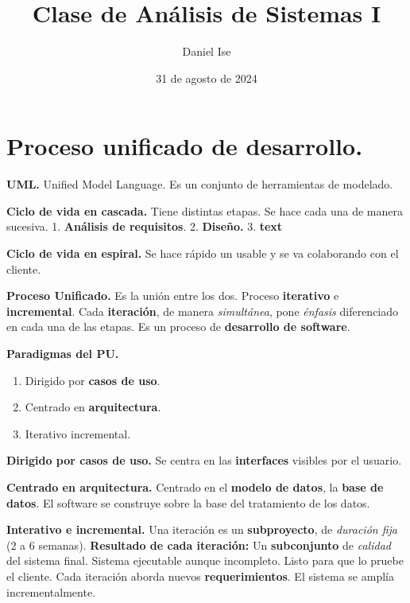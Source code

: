 \documentclass{article}
\title{Clase de Análisis de Sistemas I}
\author{Daniel Ise}
\date{31 de agosto de 2024}
\begin{document}
\maketitle

\section*{Proceso unificado de desarrollo.}

\textbf{UML.} Unified Model Language.
Es un conjunto de herramientas de modelado.

\textbf{Ciclo de vida en cascada.}
Tiene distintas etapas.
Se hace cada una de manera sucesiva.
1. \textbf{Análisis de requisitos}.
2. \textbf{Diseño.}
3. \textbf{text}

\textbf{Ciclo de vida en espiral.}
Se hace rápido un usable y se va colaborando con el cliente.

\textbf{Proceso Unificado.}
Es la unión entre los dos.
Proceso \textbf{iterativo} e \textbf{incremental}.
Cada \textbf{iteración}, de manera \textit{simultánea},
pone \textit{énfasis} diferenciado en cada una de las etapas.
Es un proceso de \textbf{desarrollo de software}.

\textbf{Paradigmas del PU.}

\begin{enumerate}
    \item Dirigido por \textbf{casos de uso}.
    \item Centrado en \textbf{arquitectura}.
    \item Iterativo incremental.
\end{enumerate}

\textbf{Dirigido por casos de uso.}
Se centra en las \textbf{interfaces} visibles por el usuario.

\textbf{Centrado en arquitectura.}
Centrado en el \textbf{modelo de datos}, la \textbf{base de datos}.
El software se construye sobre la base del tratamiento de los datos.

\textbf{Interativo e incremental.}
Una iteración es un \textbf{subproyecto},
de \textit{duración fija} (2 a 6 semanas).
\textbf{Resultado de cada iteración:}
Un \textbf{subconjunto} de \textit{calidad} del sistema final.
Sistema ejecutable aunque incompleto.
Listo para que lo pruebe el cliente.
Cada iteración aborda nuevos \textbf{requerimientos}.
El sistema se amplía incrementalmente.
\end{document}
